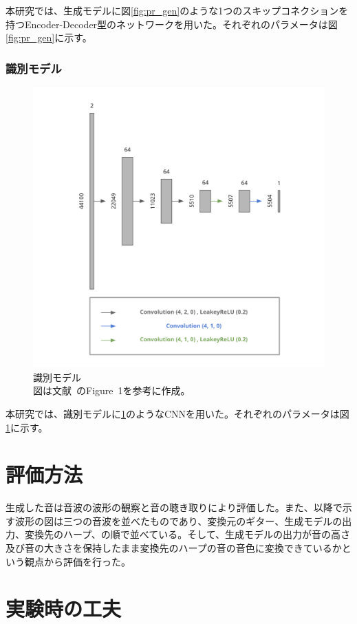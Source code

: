 本研究では、生成モデルに図\ref{fig:pr_gen}のような1つのスキップコネクションを持つEncoder-Decoder型のネットワークを用いた。それぞれのパラメータは図\ref{fig:pr_gen}に示す。

\subsubsection{識別モデル}

\begin{figure}[b]
\begin{center}
\includegraphics[width=0.8\hsize]{figure/pr_discriminator.png}
\caption{識別モデル\\
図は文献~\cite{u-net}のFigure~1を参考に作成。}
\label{fig:pr_dis}
\end{center}
\end{figure}

本研究では、識別モデルに\ref{fig:pr_dis}のようなCNNを用いた。それぞれのパラメータは図\ref{fig:pr_dis}に示す。

\section{評価方法}

生成した音は音波の波形の観察と音の聴き取りにより評価した。また、以降で示す波形の図は三つの音波を並べたものであり、変換元のギター、生成モデルの出力、変換先のハープ、の順で並べている。そして、生成モデルの出力が音の高さ及び音の大きさを保持したまま変換先のハープの音の音色に変換できているかという観点から評価を行った。

\section{実験時の工夫}

